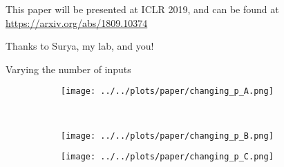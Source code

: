 \documentclass{beamer}
\begin{document}
\begin{frame}[standout]
This paper will be presented at ICLR 2019, and can be found at \url{https://arxiv.org/abs/1809.10374} \\[1em]
\end{frame}

\begin{frame}[standout]
Thanks to Surya, my lab, and you!
\end{frame}

\begin{frame}[allowframebreaks]


{}

\end{frame}

\appendix
\begin{frame}{Varying the number of inputs}
\begin{figure}[t]
\centering
\begin{subfigure}[t]{0.48\textwidth}
\texttt{[image: ../../plots/paper/changing\_p\_A.png]}
\label{supp_P_fig_A}
\end{subfigure}\\[-1em]
\begin{subfigure}[t]{0.36\textwidth}
\texttt{[image: ../../plots/paper/changing\_p\_B.png]}
\label{supp_P_fig_B}
\end{subfigure}%
\begin{subfigure}[t]{0.48\textwidth}
\texttt{[image: ../../plots/paper/changing\_p\_C.png]}
\label{supp_P_fig_C}
\end{subfigure}
\end{figure}
\end{frame}
\end{document}
